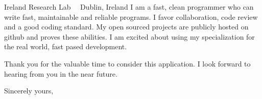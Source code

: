 \documentclass{scrlttr2}
\renewcommand{\\}{\ {\large\textperiodcentered}\ }
\begin{document}
\begin{letter}{ %
Ireland Research Lab\\
Dublin, Ireland
}
I am a fast, clean programmer who can write fast, maintainable and reliable programs.
I favor collaboration, code review and a good coding standard.
My open sourced projects are publicly hosted on github and proves these abilities.
I am excited about using my specialization for the real world, fast pased
development.


% 


Thank you for the valuable time to consider this application. I look forward to hearing from you in the near future.\\

Sincerely yours, \\
\end{letter}
\end{document}
